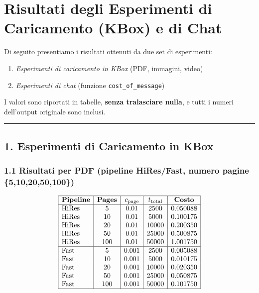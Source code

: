 \documentclass[a4paper,12pt]{article}
\begin{document}
\section*{Risultati degli Esperimenti di Caricamento (KBox) e di Chat}

Di seguito presentiamo i risultati ottenuti da due set di esperimenti:
\begin{enumerate}
  \item \emph{Esperimenti di caricamento in KBox} (PDF, immagini, video)
  \item \emph{Esperimenti di chat} (funzione \texttt{cost\_of\_message})
\end{enumerate}
I valori sono riportati in tabelle, \textbf{senza tralasciare nulla}, e tutti i numeri dell'output originale sono inclusi.

\bigskip

\hrule
\subsection*{1. Esperimenti di Caricamento in KBox}

\subsubsection*{1.1 Risultati per PDF (pipeline HiRes/Fast, numero pagine \{5,10,20,50,100\})}

\[
\begin{array}{|l|c|c|c|c|}
\hline
\textbf{Pipeline} & \textbf{Pages} & c_{\text{page}} & t_{\text{total}} & \textbf{Costo} \\
\hline
\text{HiRes} & 5 & 0.01 & 2500 & 0.050088\\
\text{HiRes} & 10 & 0.01 & 5000 & 0.100175\\
\text{HiRes} & 20 & 0.01 & 10000 & 0.200350\\
\text{HiRes} & 50 & 0.01 & 25000 & 0.500875\\
\text{HiRes} & 100 & 0.01 & 50000 & 1.001750\\
\hline
\text{Fast} & 5 & 0.001 & 2500 & 0.005088\\
\text{Fast} & 10 & 0.001 & 5000 & 0.010175\\
\text{Fast} & 20 & 0.001 & 10000 & 0.020350\\
\text{Fast} & 50 & 0.001 & 25000 & 0.050875\\
\text{Fast} & 100 & 0.001 & 50000 & 0.101750\\
\hline
\end{array}
\]
\end{document}
